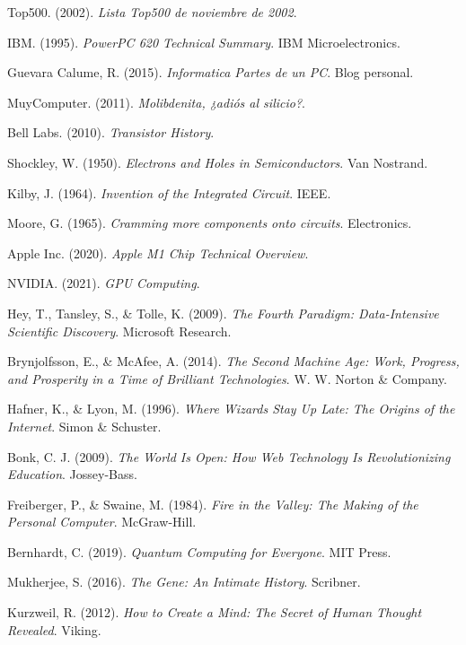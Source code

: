 \documentclass[]{article}
\begin{document}
\begin{thebibliography}{9}
Top500. (2002). \textit{Lista Top500 de noviembre de 2002}.

IBM. (1995). \textit{PowerPC 620 Technical Summary}. IBM Microelectronics.

Guevara Calume, R. (2015). \textit{Informatica Partes de un PC}. Blog personal.

MuyComputer. (2011). \textit{Molibdenita, ¿adiós al silicio?}.

Bell Labs. (2010). \textit{Transistor History}.

Shockley, W. (1950). \textit{Electrons and Holes in Semiconductors}. Van Nostrand.

Kilby, J. (1964). \textit{Invention of the Integrated Circuit}. IEEE.

Moore, G. (1965). \textit{Cramming more components onto circuits}. Electronics.

Apple Inc. (2020). \textit{Apple M1 Chip Technical Overview}.

NVIDIA. (2021). \textit{GPU Computing}.

Hey, T., Tansley, S., \& Tolle, K. (2009). 
\textit{The Fourth Paradigm: Data-Intensive Scientific Discovery}. Microsoft Research.

Brynjolfsson, E., \& McAfee, A. (2014). 
\textit{The Second Machine Age: Work, Progress, and Prosperity in a Time of Brilliant Technologies}. W. W. Norton \& Company.

Hafner, K., \& Lyon, M. (1996). 
\textit{Where Wizards Stay Up Late: The Origins of the Internet}. Simon \& Schuster.

Bonk, C. J. (2009). 
\textit{The World Is Open: How Web Technology Is Revolutionizing Education}. Jossey-Bass.

Freiberger, P., \& Swaine, M. (1984). 
\textit{Fire in the Valley: The Making of the Personal Computer}. McGraw-Hill.

Bernhardt, C. (2019). 
\textit{Quantum Computing for Everyone}. MIT Press.

Mukherjee, S. (2016). 
\textit{The Gene: An Intimate History}. Scribner.

Kurzweil, R. (2012). 
\textit{How to Create a Mind: The Secret of Human Thought Revealed}. Viking.

\end{thebibliography}
\end{document}
